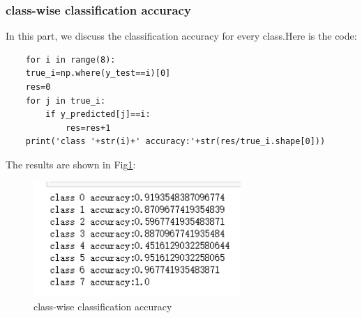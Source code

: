 \documentclass[conference]{IEEEtran}
\begin{document}
\subsubsection{class-wise classification accuracy}
In this part, we discuss the classification accuracy for every class.Here is the code:
\begin{lstlisting}
    for i in range(8):
    true_i=np.where(y_test==i)[0]
    res=0
    for j in true_i:
        if y_predicted[j]==i:
            res=res+1
    print('class '+str(i)+' accuracy:'+str(res/true_i.shape[0]))
\end{lstlisting}
The results are shown in Fig\ref{Fig.t3q2}:
\begin{figure}[H] 
    \centering %
    \includegraphics[width=0.7\textwidth]{T3Q1b.png} %
    \caption{class-wise classification accuracy} %
    \label{Fig.t3q2} %
\end{figure}
\end{document}
